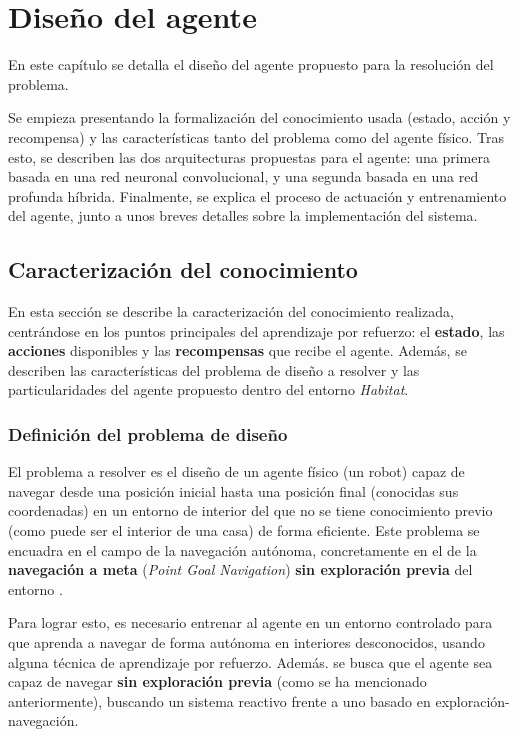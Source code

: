 \chapter{Diseño del agente}

En este capítulo se detalla el diseño del agente propuesto para la resolución del problema. 

Se empieza presentando la formalización del conocimiento usada (estado, acción y recompensa) y las características tanto del problema como del agente físico. Tras esto, se describen las dos arquitecturas propuestas para el agente: una primera basada en una red neuronal convolucional, y una segunda basada en una red profunda híbrida. Finalmente, se explica el proceso de actuación y entrenamiento del agente, junto a unos breves detalles sobre la implementación del sistema.

\section{Caracterización del conocimiento}

En esta sección se describe la caracterización del conocimiento realizada, centrándose en los puntos principales del aprendizaje por refuerzo: el \textbf{estado}, las \textbf{acciones} disponibles y las \textbf{recompensas} que recibe el agente. Además, se describen las características del problema de diseño a resolver y las particularidades del agente propuesto dentro del entorno \textit{Habitat}.

\subsection{Definición del problema de diseño}

El problema a resolver es el diseño de un agente físico (un robot) capaz de navegar desde una posición inicial hasta una posición final (conocidas sus coordenadas) en un entorno de interior del que no se tiene conocimiento previo (como puede ser el interior de una casa) de forma eficiente. Este problema se encuadra en el campo de la navegación autónoma, concretamente en el de la \textbf{navegación a meta} (\textit{Point Goal Navigation}) \textbf{sin exploración previa} del entorno \cite{DBLP:journals/corr/abs-1807-06757}.

Para lograr esto, es necesario entrenar al agente en un entorno controlado para que aprenda a navegar de forma autónoma en interiores desconocidos, usando alguna técnica de aprendizaje por refuerzo. Además. se busca que el agente sea capaz de navegar \textbf{sin exploración previa} (como se ha mencionado anteriormente), buscando un sistema reactivo frente a uno basado en exploración-navegación.

